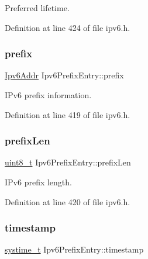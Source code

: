 Preferred lifetime. 



Definition at line 424 of file ipv6.\+h.

\mbox{\label{structIpv6PrefixEntry_ac8fdea2f9884d84f35af314249e47aa4}} 
\subsubsection{\texorpdfstring{prefix}{prefix}}
{\footnotesize\ttfamily \hyperlink{ipv6_8h_aed0cbc40c61ed5b4fb681ebc55237e89}{Ipv6\+Addr} Ipv6\+Prefix\+Entry\+::prefix}



I\+Pv6 prefix information. 



Definition at line 419 of file ipv6.\+h.

\mbox{\label{structIpv6PrefixEntry_a42ac450d305210faf002c0b59e0c9bc8}} 
\subsubsection{\texorpdfstring{prefix\+Len}{prefixLen}}
{\footnotesize\ttfamily \hyperlink{stdint_8h_aba7bc1797add20fe3efdf37ced1182c5}{uint8\+\_\+t} Ipv6\+Prefix\+Entry\+::prefix\+Len}



I\+Pv6 prefix length. 



Definition at line 420 of file ipv6.\+h.

\mbox{\label{structIpv6PrefixEntry_a3c685a8be455dd84c5b4886b082fe943}} 
\subsubsection{\texorpdfstring{timestamp}{timestamp}}
{\footnotesize\ttfamily \hyperlink{compiler__port_8h_ae3e32a98d431a02106616da3071832dd}{systime\+\_\+t} Ipv6\+Prefix\+Entry\+::timestamp}




